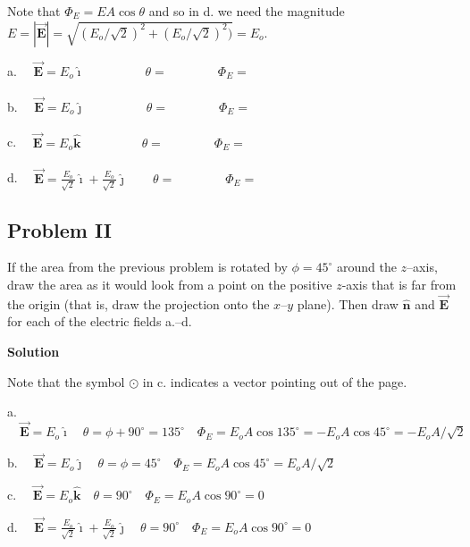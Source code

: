 \documentclass{article}
\newcommand{\ds}[0]{\displaystyle}
\newcommand{\ihat}[0]{\hat{\boldsymbol{\imath}}}
\newcommand{\jhat}[0]{\hat{\boldsymbol{\jmath}}}
\newcommand{\khat}[0]{\hat{\boldsymbol{k}}}
\newcommand{\bfvec}[1]{\vec{\mathbf{#1}}}
\begin{document}
\begin{enumerate}
        Note that $\Phi_E=EA\cos\theta$ and so in d. we need the magnitude $E = |\bfvec{E}| = \sqrt{(E_o/\sqrt{2})^2+(E_o/\sqrt{2})^2)}=E_o$.
        \else

        

        a. $\quad\ds\bfvec{E}=E_o\ihat\qquad\phantom{+\frac{E_o}{\sqrt{2}}\jhat}\theta=\qquad\qquad\Phi_E=$

        b. $\quad\ds\bfvec{E}=E_o\jhat\qquad\phantom{+ \frac{E_o}{\sqrt{2}}\jhat}\theta=\qquad\qquad\Phi_E=$ 

        c. $\quad\ds\bfvec{E}=E_o\khat\qquad\phantom{+\frac{E_o}{\sqrt{2}}\jhat}\theta=\qquad\qquad\Phi_E=$ 

        d. $\quad\ds\bfvec{E}=\frac{E_o}{\sqrt{2}}\ihat + \frac{E_o}{\sqrt{2}}\jhat\qquad\theta=\qquad\qquad\Phi_E=$

        \newpage
        \fi

\end{enumerate}

\subsection{Problem II}

\ifsolutions

\else


\fi

If the area from the previous problem is rotated by $\phi=45^\circ$ around the $z$--axis, draw the area as it would look from a point on the positive $z$-axis that is far from the origin (that is, draw the projection onto the $x$--$y$ plane). Then draw $\hat{\mathbf{n}}$ and $\bfvec{E}$ for each of the electric fields a.--d.

\ifsolutions
\textbf{Solution} 

Note that the symbol $\odot$ in c. indicates a vector pointing out of the page.



a. $\quad\ds\bfvec{E}=E_o\ihat\quad\theta=\phi+90^\circ=135^\circ\quad\Phi_E=E_oA\cos 135^\circ=-E_oA\cos 45^\circ=-E_oA/\sqrt{2}$

b. $\quad\ds\bfvec{E}=E_o\jhat\quad\theta=\phi=45^\circ\quad\Phi_E=E_oA\cos 45^\circ=E_oA/\sqrt{2}$ 

c. $\quad\ds\bfvec{E}=E_o\khat\quad\theta=90^\circ\quad\Phi_E=E_oA\cos 90^\circ=0$ 

d. $\quad\ds\bfvec{E}=\frac{E_o}{\sqrt{2}}\ihat + \frac{E_o}{\sqrt{2}}\jhat\quad\theta=90^\circ\quad\Phi_E=E_oA\cos 90^\circ=0$
\else
\end{document}
